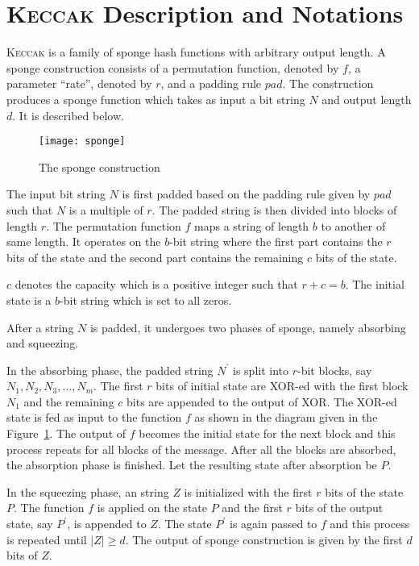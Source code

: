 \documentclass[runningheads]{llncs}
\newcommand{\Keccak}{\mbox{\textsc{Keccak}}}
\begin{document}
\section{\Keccak{} Description and Notations}
\Keccak{} is a family of sponge hash functions with arbitrary output length. A sponge construction consists of a permutation function, denoted by $f$, a parameter ``rate'', denoted by $r$, and a padding rule ${pad}$. The construction 
produces a sponge function which takes as input a bit string $N$ and output length $d$. 
It is described below.

\begin{figure}
\texttt{[image: sponge]}
\caption{The sponge construction~\cite{bertoni2011cryptographic}\label{sponge}}
\end{figure}
The input bit string $N$ is first padded based on the padding rule given by $pad$ such that $N$ is a multiple of $r$. The padded string is then divided into blocks of length $r$. The permutation function $f$ maps a string of length $b$ to another of same length. It operates on the $b$-bit string where the first part contains the $r$ bits of the state and the second part contains the remaining $c$ bits of the state.

$c$ denotes the capacity which is a positive integer such that $r + c = b$. The initial state is a $b$-bit string which is set to all zeros. 

After a string $N$ is padded, it undergoes two phases of sponge, namely absorbing and squeezing. 

In the absorbing phase, the padded string $N^\prime$ is split into $r$-bit blocks, say $N_1, N_2, N_3,\ldots,N_m$. The first $r$ bits of initial state are XOR-ed with the first block $N_1$ and the remaining $c$ bits are appended to the output of XOR. The XOR-ed state is fed as input to the function $f$ as shown in the diagram given in the Figure~\ref{sponge}. The output of $f$ becomes the initial state for the next block and this process repeats for all blocks of the message. After all the blocks are absorbed, the absorption phase is finished. Let the resulting state after absorption be $P$. 

In the squeezing phase, an string $Z$ is initialized with the first $r$ bits of the state $P$. The function $f$ is applied on the state $P$ and the first $r$ bits of the output state, say $P^\prime$, is appended to $Z$. The state $P^\prime$ is again passed to $f$ and this process is repeated until $|Z| \geq d$. The output of sponge construction is given by the first $d$ bits of $Z$.
% 
\end{document}
